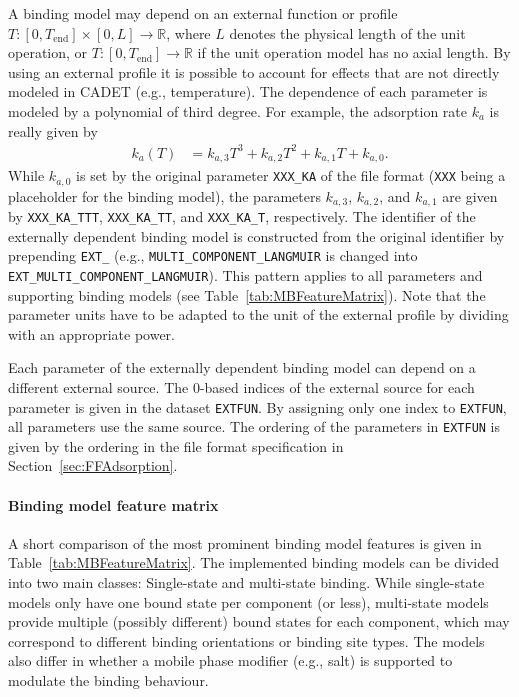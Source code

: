 A binding model may depend on an external function or profile $T\colon \left[ 0, T_{\text{end}}\right] \times [0, L] \to \mathds{R}$, where $L$ denotes the physical length of the unit operation, or $T\colon \left[0, T_{\text{end}}\right] \to \mathds{R}$ if the unit operation model has no axial length. 
By using an external profile it is possible to account for effects that are not directly modeled in CADET (e.g., temperature).
The dependence of each parameter is modeled by a polynomial of third degree.
For example, the adsorption rate $k_a$ is really given by
\begin{align*}
  k_a(T) &= k_{a,3} T^3 + k_{a,2} T^2 + k_{a,1} T + k_{a,0}.
\end{align*}
While $k_{a,0}$ is set by the original parameter \texttt{XXX\_KA} of the file format (\texttt{XXX} being a placeholder for the binding model), the parameters $k_{a,3}$, $k_{a,2}$, and $k_{a,1}$ are given by \texttt{XXX\_KA\_TTT}, \texttt{XXX\_KA\_TT}, and \texttt{XXX\_KA\_T}, respectively.
The identifier of the externally dependent binding model is constructed from the original identifier by prepending \texttt{EXT\_} (e.g., \texttt{MULTI\_COMPONENT\_LANGMUIR} is changed into \texttt{EXT\_MULTI\_COMPONENT\_LANGMUIR}).
This pattern applies to all parameters and supporting binding models (see Table~\ref{tab:MBFeatureMatrix}).
Note that the parameter units have to be adapted to the unit of the external profile by dividing with an appropriate power.

Each parameter of the externally dependent binding model can depend on a different external source.
The 0-based indices of the external source for each parameter is given in the dataset \texttt{EXTFUN}.
By assigning only one index to \texttt{EXTFUN}, all parameters use the same source.
The ordering of the parameters in \texttt{EXTFUN} is given by the ordering in the file format specification in Section~\ref{sec:FFAdsorption}.

\paragraph{Binding model feature matrix}
\label{par:MBFeatureMatrix}

A short comparison of the most prominent binding model features is given in Table~\ref{tab:MBFeatureMatrix}.
The implemented binding models can be divided into two main classes: Single-state and multi-state binding.
While single-state models only have one bound state per component (or less), multi-state models provide multiple (possibly different) bound states for each component, which may correspond to different binding orientations or binding site types.
The models also differ in whether a mobile phase modifier (e.g., salt) is supported to modulate the binding behaviour.

